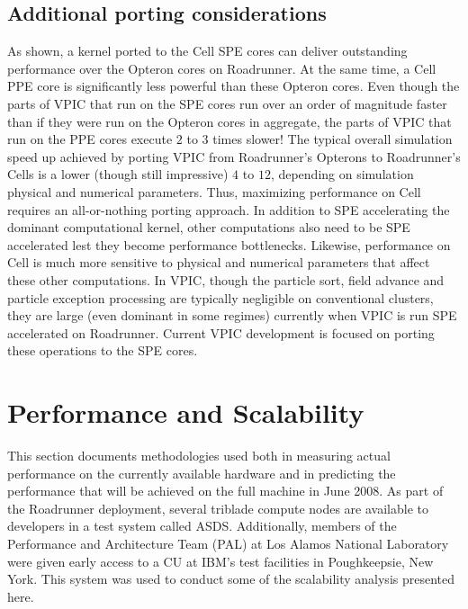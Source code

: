 \documentclass[journal,twoside]{IEEEtran}
\begin{document}
\subsection{Additional porting considerations}

As shown, a kernel ported to the Cell SPE cores can deliver
outstanding performance over the Opteron cores on Roadrunner.  At the
same time, a Cell PPE core is significantly less powerful than these
Opteron cores.  Even though the parts of VPIC that run on the SPE
cores run over an order of magnitude faster than if they were run on
the Opteron cores in aggregate, the parts of VPIC that run on the PPE
cores execute $2$ to $3$ times slower!  The typical overall simulation
speed up achieved by porting VPIC from Roadrunner's Opterons to
Roadrunner's Cells is a lower (though still impressive) $4$ to $12$,
depending on simulation physical and numerical parameters.  Thus,
maximizing performance on Cell requires an all-or-nothing porting
approach.  In addition to SPE accelerating the dominant computational
kernel, other computations also need to be SPE accelerated lest they
become performance bottlenecks.  Likewise, performance on Cell is much
more sensitive to physical and numerical parameters that affect these
other computations.  In VPIC, though the particle sort, field advance
and particle exception processing are typically negligible on
conventional clusters, they are large (even dominant in some regimes)
currently when VPIC is run SPE accelerated on Roadrunner.  Current
VPIC development is focused on porting these operations to the SPE
cores.

\section{Performance and Scalability} \label{sec:performance}

This section documents methodologies used both in measuring actual
performance on the currently available hardware and in predicting the
performance that will be achieved on the full machine in June 2008.
As part of the Roadrunner deployment, several triblade compute nodes
are available to developers in a test system called ASDS.
Additionally, members of the Performance and Architecture Team (PAL)
at Los Alamos National Laboratory were given early access to a CU at
IBM's test facilities in Poughkeepsie, New York.  This system was used
to conduct some of the scalability analysis presented here.
\end{document}
